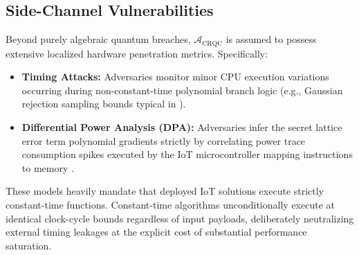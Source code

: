 \subsection{Side-Channel Vulnerabilities}

Beyond purely algebraic quantum breaches, $\mathcal{A}_{\text{CRQC}}$ is assumed to possess extensive localized hardware penetration metrics. Specifically:
\begin{itemize}
 \item \textbf{Timing Attacks:} Adversaries monitor minor CPU execution variations occurring during non-constant-time polynomial branch logic (e.g., Gaussian rejection sampling bounds typical in \falcon{}).
 \item \textbf{Differential Power Analysis (DPA):} Adversaries infer the secret lattice error term polynomial gradients strictly by correlating power trace consumption spikes executed by the IoT microcontroller mapping instructions to memory \cite{kocher1999differential, hutter2011side}.
\end{itemize}
These models heavily mandate that deployed IoT solutions execute strictly constant-time functions. Constant-time algorithms unconditionally execute at identical clock-cycle bounds regardless of input payloads, deliberately neutralizing external timing leakages at the explicit cost of substantial performance saturation.
